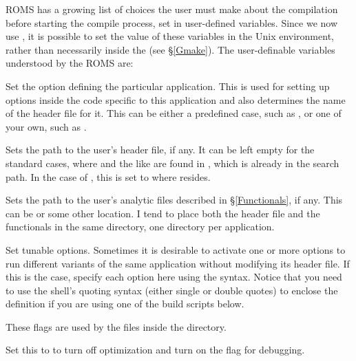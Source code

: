 ROMS has a growing list of choices the user must make about the
compilation before starting the compile process,
set in user-defined variables. Since we now use , it is
possible to set the value of these variables in the Unix environment,
rather than necessarily inside the  (see \S\ref{Gmake}).
The user-definable variables understood by the ROMS  are:
\begin{klist}

 Set the  option defining the particular
application. This is used for setting up options inside the code
specific to this application and also determines the name of the
 header file for it. This can be either a predefined
case, such as , or one of your own, such as .

 Sets the path to the user's header file, if
any. It can be left empty for the standard cases, where 
and the like are found in , which is already in
the search path. In the case of , this is set to
 where  resides.

 Sets the path to the user's analytic files
described in \S\ref{Functionals}, if any. This can be 
or some other location. I tend to place both the header file and the
functionals in the same directory, one directory per application.

 Set tunable  options. Sometimes it is desirable
to activate one or more  options to run different variants of the
same application without modifying its header file. If this is the
case, specify each option here using the  syntax. Notice that
you need to use the shell's quoting syntax (either single or double
quotes) to enclose the definition if you are using one of the build
scripts below.


 These flags are used by the files
inside the  directory.
\begin{klist}
   Set this to  to turn off optimization
and turn on the  flag for debugging.


\end{klist}
\end{klist}
